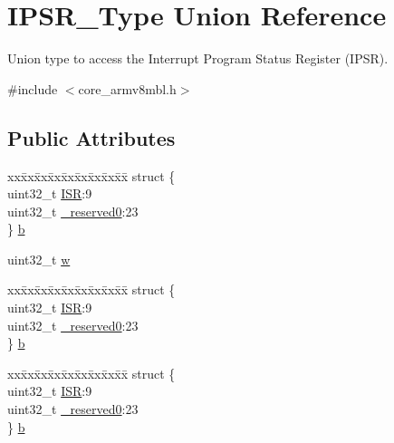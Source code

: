 \hypertarget{union_i_p_s_r___type}{}\section{I\+P\+S\+R\+\_\+\+Type Union Reference}
\label{union_i_p_s_r___type}


Union type to access the Interrupt Program Status Register (I\+P\+SR).  




{\ttfamily \#include $<$core\+\_\+armv8mbl.\+h$>$}

\subsection*{Public Attributes}
\begin{DoxyCompactItemize}
\item 
\begin{tabbing}
xx\=xx\=xx\=xx\=xx\=xx\=xx\=xx\=xx\=\kill
struct \{\\
\>uint32\_t \hyperlink{union_i_p_s_r___type_ab46e5f1b2f4d17cfb9aca4fffcbb2fa5}{ISR}:9\\
\>uint32\_t \hyperlink{union_i_p_s_r___type_ad2eb0a06de4f03f58874a727716aa9aa}{\_reserved0}:23\\
\} \hyperlink{union_i_p_s_r___type_add0d6497bd50c25569ea22b48a03ec50}{b}\\

\end{tabbing}\item 
uint32\+\_\+t \hyperlink{union_i_p_s_r___type_a4adca999d3a0bc1ae682d73ea7cfa879}{w}
\item 
\begin{tabbing}
xx\=xx\=xx\=xx\=xx\=xx\=xx\=xx\=xx\=\kill
struct \{\\
\>uint32\_t \hyperlink{union_i_p_s_r___type_ab46e5f1b2f4d17cfb9aca4fffcbb2fa5}{ISR}:9\\
\>uint32\_t \hyperlink{union_i_p_s_r___type_ad2eb0a06de4f03f58874a727716aa9aa}{\_reserved0}:23\\
\} \hyperlink{union_i_p_s_r___type_aa11b32974d63dd51990089397c4f00f6}{b}\\

\end{tabbing}\item 
\begin{tabbing}
xx\=xx\=xx\=xx\=xx\=xx\=xx\=xx\=xx\=\kill
struct \{\\
\>uint32\_t \hyperlink{union_i_p_s_r___type_ab46e5f1b2f4d17cfb9aca4fffcbb2fa5}{ISR}:9\\
\>uint32\_t \hyperlink{union_i_p_s_r___type_ad2eb0a06de4f03f58874a727716aa9aa}{\_reserved0}:23\\
\} \hyperlink{union_i_p_s_r___type_a53babc0905b7d49ccf703851e101b38a}{b}\\


\end{tabbing}
\end{DoxyCompactItemize}
